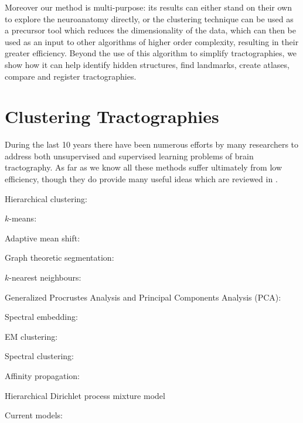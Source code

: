 \documentclass[preprint,authoryear,a4paper,10pt,onecolumn]{elsarticle}
\begin{document}
Moreover our method is multi-purpose: its results can either stand on
their own to explore the neuroanatomy directly, or the clustering
technique can be used as a precursor tool which reduces the
dimensionality of the data, which can then be used as an input to other
algorithms of higher order complexity, resulting in their greater
efficiency. Beyond the use of this algorithm to simplify tractographies,
we show how it can help identify hidden structures, find landmarks,
create atlases, compare and register tractographies.

\section{Clustering Tractographies}

During the last 10 years there have been numerous efforts by many
researchers to address both unsupervised and supervised learning
problems of brain tractography. As far as we know all these methods
suffer ultimately from low efficiency, though they do provide many
useful ideas which are reviewed in \citet{Garyfallidis_thesis}.

\begin{description}

\item[Hierarchical clustering:] \citep{Visser2010, gerig2004analysis,
    Guevara2010, zhang2005dti, jianu2009exploring}

\item[$k$-means:] \citep{ElKouby2005, Tsai2007}

\item[Adaptive mean shift:] \citep{zvitia2008adaptive, Zvitia2010}

\item[Graph theoretic segmentation:] \citep{brun2004clustering}

\item[$k$-nearest neighbours:] \citep{Ding2003a}

\item[Generalized Procrustes Analysis and Principal Components Analysis (PCA):]
\citep{Corouge2004, corouge2004towards, Corouge2006}

\item[Spectral embedding:] \citep{ODonnell_IEEETMI07}

\item[EM clustering:] \citep{Maddah_MICCA2005, maddah2006statistical,
Maddah_IEEEBI2008, ziyan2009consistency} 

\item[Spectral clustering:] \citep{jonasson2005fiber}
 
\item[Affinity propagation:] \citep{leemans17new, malcolm2009filtered}

\item[Hierarchical Dirichlet process mixture model] \citep{wang2010tractography}

\item[Current models:] \citep{Durrleman2009, durrleman2010registration}

\end{description}
\end{document}
